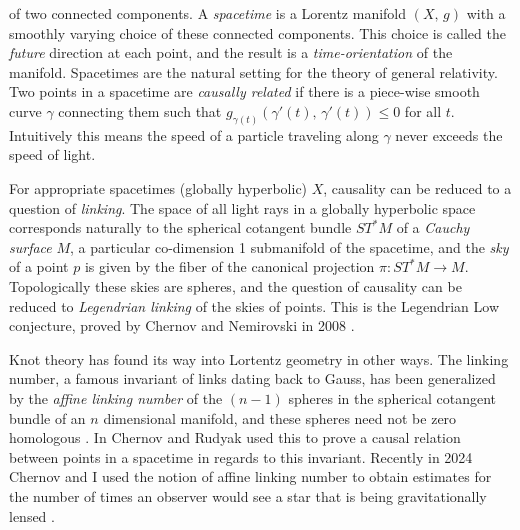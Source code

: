 \documentclass{article}
\begin{document}
        of two connected components. A \textit{spacetime} is a Lorentz manifold
        $(X,\,g)$ with a smoothly varying choice of these connected
        components. This choice is called the \textit{future} direction at
        each point, and the result is a \textit{time-orientation} of the
        manifold. Spacetimes are the natural setting for the theory of
        general relativity. Two points in a spacetime are
        \textit{causally related} if there is a piece-wise smooth curve
        $\gamma$ connecting them such that
        $g_{\gamma(t)}(\gamma'(t),\,\gamma'(t))\leq{0}$ for all $t$.
        Intuitively this means the speed of a particle traveling along $\gamma$
        never exceeds the speed of light.
        \par\hfill\par
        For appropriate spacetimes (globally hyperbolic) $X$, causality can be
        reduced to a question of \textit{linking}. The space of all light rays
        in a globally hyperbolic space corresponds naturally to the
        spherical cotangent bundle $ST^{*}M$ of a \textit{Cauchy surface} $M$,
        a particular co-dimension 1 submanifold of the spacetime, and the
        \textit{sky} of a point $p$ is given by the fiber of the canonical
        projection $\pi:ST^{*}M\rightarrow{M}$. Topologically these skies are
        spheres, and the question of causality can be reduced to
        \textit{Legendrian linking} of the skies of points. This is the
        Legendrian Low conjecture, proved by Chernov and Nemirovski in 2008
        \cite{ChernovNemirovski2010LowConj}.
        \par\hfill\par
        Knot theory has found its way into Lortentz geometry in other ways.
        The linking number, a famous invariant of links dating back to Gauss,
        has been generalized by the \textit{affine linking number} of the
        $(n-1)$ spheres in the spherical cotangent bundle of an $n$ dimensional
        manifold, and these spheres need not be zero homologous
        \cite{ChernovRudyak2003AffineLinkingGeneralTheory}.
        In \cite{ChernovRudyak2002AffineLinkingAndCausality}
        Chernov and Rudyak used this to prove a causal
        relation between points in a spacetime in regards to this invariant.
        Recently in 2024 Chernov and I used the notion of affine linking
        number to obtain estimates for the number of times an observer would
        see a star that is being gravitationally lensed
        \cite{MaguireChernovAffineLinkingNumber}.
\end{document}
